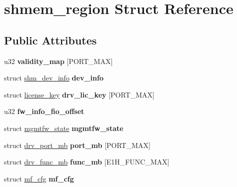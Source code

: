 \hypertarget{structshmem__region}{
\section{shmem\_\-region Struct Reference}
\label{structshmem__region}
}
\subsection*{Public Attributes}
\begin{DoxyCompactItemize}
\item 
\hypertarget{structshmem__region_a7e6026bc81fccd9aec6d0f8444c0e83a}{
u32 {\bfseries validity\_\-map} \mbox{[}PORT\_\-MAX\mbox{]}}
\label{structshmem__region_a7e6026bc81fccd9aec6d0f8444c0e83a}

\item 
\hypertarget{structshmem__region_aa17a06dc14ace39b6aa82e0d28bbf486}{
struct \hyperlink{structshm__dev__info}{shm\_\-dev\_\-info} {\bfseries dev\_\-info}}
\label{structshmem__region_aa17a06dc14ace39b6aa82e0d28bbf486}

\item 
\hypertarget{structshmem__region_ac44e0ae36a7c8d7dacef19a7de902488}{
struct \hyperlink{structlicense__key}{license\_\-key} {\bfseries drv\_\-lic\_\-key} \mbox{[}PORT\_\-MAX\mbox{]}}
\label{structshmem__region_ac44e0ae36a7c8d7dacef19a7de902488}

\item 
\hypertarget{structshmem__region_a013621c2dc9d89c4c1db1ba23b016010}{
u32 {\bfseries fw\_\-info\_\-fio\_\-offset}}
\label{structshmem__region_a013621c2dc9d89c4c1db1ba23b016010}

\item 
\hypertarget{structshmem__region_aac3b79bae0bc8e67266885edb393be27}{
struct \hyperlink{structmgmtfw__state}{mgmtfw\_\-state} {\bfseries mgmtfw\_\-state}}
\label{structshmem__region_aac3b79bae0bc8e67266885edb393be27}

\item 
\hypertarget{structshmem__region_a0029c2fd406662f61d5e45030f0c3072}{
struct \hyperlink{structdrv__port__mb}{drv\_\-port\_\-mb} {\bfseries port\_\-mb} \mbox{[}PORT\_\-MAX\mbox{]}}
\label{structshmem__region_a0029c2fd406662f61d5e45030f0c3072}

\item 
\hypertarget{structshmem__region_afdaca03c4878e9990746716b8bb26a92}{
struct \hyperlink{structdrv__func__mb}{drv\_\-func\_\-mb} {\bfseries func\_\-mb} \mbox{[}E1H\_\-FUNC\_\-MAX\mbox{]}}
\label{structshmem__region_afdaca03c4878e9990746716b8bb26a92}

\item 
\hypertarget{structshmem__region_a5fdffe8ea7920136c2177cc27ee59a12}{
struct \hyperlink{structmf__cfg}{mf\_\-cfg} {\bfseries mf\_\-cfg}}
\label{structshmem__region_a5fdffe8ea7920136c2177cc27ee59a12}

\end{DoxyCompactItemize}


